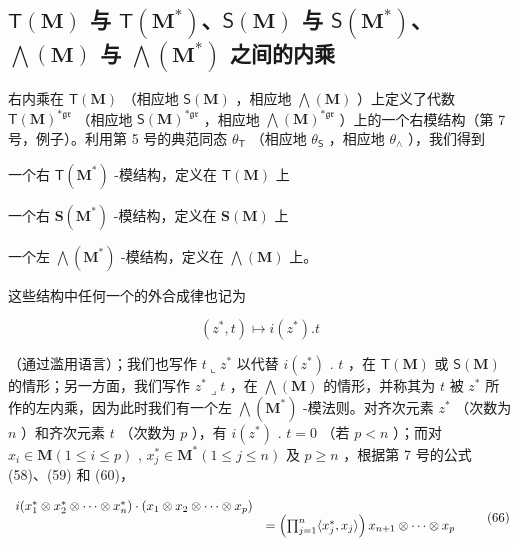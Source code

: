 \subsection{\texorpdfstring{\(\mathsf{T}(\mathbf{M})\) 与 \(\mathsf{T}(\mathbf{M}^{*})\)、\(\mathsf{S}(\mathbf{M})\) 与 \(\mathsf{S}(\mathbf{M}^{*})\)、\(\bigwedge(\mathbf{M})\) 与 \(\bigwedge(\mathbf{M}^{*})\) 之间的内乘}{T(M) 与 T(M*)、S(M) 与 S(M*)、wedge(M) 与 wedge(M*) 之间的内乘}}

右内乘在 \(\mathsf{T}(\mathbf{M})\) （相应地 \(\mathsf{S}(\mathbf{M})\) ，相应地 \(\bigwedge (\mathbf{M})\) ）上定义了代数 \(\mathsf{T}(\mathbf{M})^{*\mathfrak{g}\mathfrak{r}}\) （相应地 \(\mathsf{S}(\mathbf{M})^{*\mathfrak{g}\mathfrak{r}}\) ，相应地 \(\bigwedge (\mathbf{M})^{*\mathfrak{g}\mathfrak{r}}\) ）上的一个右模结构（第 7 号，例子）。利用第 5 号的典范同态 \(\theta_{\mathsf{T}}\) （相应地 \(\theta_{\mathsf{S}}\) ，相应地 \(\theta_{\wedge}\) ），我们得到

一个右 \(\mathsf{T}(\mathbf{M}^{*})\) -模结构，定义在 \(\mathsf{T}(\mathbf{M})\) 上

一个右 \(\mathbf{S}(\mathbf{M}^{*})\) -模结构，定义在 \(\mathbf{S}(\mathbf{M})\) 上

一个左 \(\bigwedge (\mathbf{M}^{*})\) -模结构，定义在 \(\bigwedge (\mathbf{M})\) 上。

这些结构中任何一个的外合成律也记为

\[
(z ^ {*}, t) \mapsto i (z ^ {*}). t
\]

（通过滥用语言）；我们也写作 \(t \llcorner z^*\) 以代替 \(i(z^*)\) . \(t\) ，在 \(\mathsf{T}(\mathbf{M})\) 或 \(\mathsf{S}(\mathbf{M})\) 的情形；另一方面，我们写作 \(z^* \lrcorner t\) ，在 \(\bigwedge (\mathbf{M})\) 的情形，并称其为 \(t\) 被 \(z^*\) 所作的左内乘，因为此时我们有一个左 \(\bigwedge (\mathbf{M}^*)\) -模法则。对齐次元素 \(z^*\) （次数为 \(n\) ）和齐次元素 \(t\) （次数为 \(p\) ），有 \(i(z^*)\) . \(t = 0\) （若 \(p < n\) ）；而对 \(x_i \in \mathbf{M} (1 \leqslant i \leqslant p)\) , \(x_j^* \in \mathbf{M}^* (1 \leqslant j \leqslant n)\) 及 \(p \geqslant n\) ，根据第 7 号的公式 (58)、(59) 和 (60)，

\[
\begin{array}{r l} i (x _ {1} ^ {*} \otimes x _ {2} ^ {*} \otimes \dots \otimes x _ {n} ^ {*}) \cdot (x _ {1} \otimes x _ {2} \otimes \dots \otimes x _ {p}) \\ & = \left(\prod_ {j = 1} ^ {n} \langle x _ {j} ^ {*}, x _ {j} \rangle\right) x _ {n + 1} \otimes \dots \otimes x _ {p} \end{array}\tag{66}
\]

